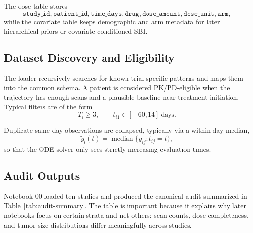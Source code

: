 \documentclass[11pt,a4paper]{article}
\begin{document}
The dose table stores
\[
    \texttt{study\_id},
    \texttt{patient\_id},
    \texttt{time\_days},
    \texttt{drug},
    \texttt{dose\_amount},
    \texttt{dose\_unit},
    \texttt{arm},
\]
while the covariate table keeps demographic and arm metadata for later hierarchical priors or covariate-conditioned SBI.

\subsection{Dataset Discovery and Eligibility}

The loader recursively searches for known trial-specific patterns and maps them into the common schema. A patient is considered PK/PD-eligible when the trajectory has enough scans and a plausible baseline near treatment initiation. Typical filters are of the form
\[
    T_i\geq 3,
    \qquad
    t_{i1}\in[-60,14]\ \text{days}.
\]

Duplicate same-day observations are collapsed, typically via a within-day median,
\[
    \widetilde y_i(t)=\operatorname{median}\{y_{ij}:t_{ij}=t\},
\]
so that the ODE solver only sees strictly increasing evaluation times.

\subsection{Audit Outputs}

Notebook 00 loaded ten studies and produced the canonical audit summarized in Table~\ref{tab:audit-summary}. The table is important because it explains why later notebooks focus on certain strata and not others: scan counts, dose completeness, and tumor-size distributions differ meaningfully across studies.
\end{document}
